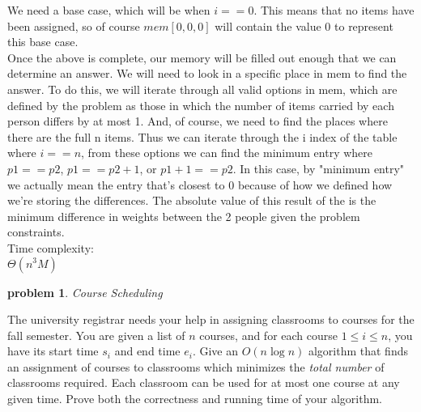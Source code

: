 \documentclass[10pt]{article}
\newtheorem{problem}{\sc\color{cit}problem}
\begin{document}
{    We need a base case, which will be when $i == 0$. This means that no items have been assigned, so of course $mem[0, 0, 0]$ will contain the value $0$ to represent this base case. \\
    Once the above is complete, our memory will be filled out enough that we can determine an answer. We will need to look in a specific place in mem to find the answer. To do this, we will iterate through all valid options in mem, which are defined by the problem as those in which the number of items carried by each person differs by at most 1. And, of course, we need to find the places where there are the full n items. Thus we can iterate through the i index of the table where $i == n$, from these options we can find the minimum entry where $p1 == p2$, $p1 == p2 + 1$, or $p1 + 1 == p2$. In this case, by "minimum entry" we actually mean the entry that's closest to $0$ because of how we defined how we're storing the differences. The absolute value of this result of the is the minimum difference in weights between the 2 people given the problem constraints. \\
    Time complexity: \\
    $\Theta(n^3M)$
}


\begin{problem}Course Scheduling\end{problem}
The university registrar needs your help in assigning classrooms to courses
for the fall semester. You are given a list of $n$ courses, and for each course $1 \le i \le n$,
you have its start time $s_i$ and end time $e_i$. Give an $O(n \log n)$
algorithm that finds an assignment of
courses to classrooms which minimizes the {\em total number} of classrooms required. Each classroom
can be used for at most one course at any given time. Prove both the correctness and running time
of your algorithm.
\end{document}
